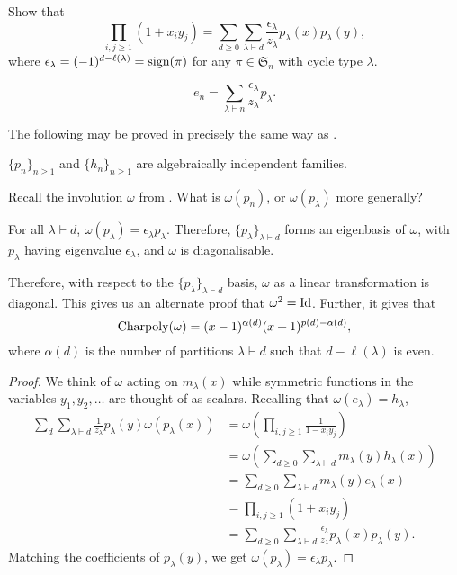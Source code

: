 	\begin{exercise}
		Show that
		\[ \prod_{i,j \ge 1} (1+x_iy_j) = \sum_{d \ge 0} \sum_{\lambda \vdash d} \frac{\epsilon_\lambda}{z_\lambda} p_\lambda(x) p_\lambda(y), \]
		where $\epsilon_\lambda = (-1)^{d - \ell(\lambda)} = \operatorname{sign}(\pi)$ for any $\pi \in \mathfrak{S}_n$ with cycle type $\lambda$.
	\end{exercise}

	\begin{corollary}
		\[ e_n = \sum_{\lambda \vdash n} \frac{\epsilon_\lambda}{z_\lambda} p_\lambda. \]
	\end{corollary}

	The following may be proved in precisely the same way as .
	\begin{fpor}
		$\{p_n\}_{n \ge 1}$ and $\{h_n\}_{n \ge 1}$ are algebraically independent families.
	\end{fpor}

	Recall the involution $\omega$ from . What is $\omega(p_n)$, or $\omega(p_\lambda)$ more generally?

	\begin{ftheo}
		\label{theo: p eigenbasis of omega}
		For all $\lambda \vdash d$, $\omega(p_\lambda) = \epsilon_\lambda p_\lambda$. Therefore, $\{p_\lambda\}_{\lambda \vdash d}$ forms an eigenbasis of $\omega$, with $p_\lambda$ having eigenvalue $\epsilon_\lambda$, and $\omega$ is diagonalisable.
	\end{ftheo}
	Therefore, with respect to the $\{p_\lambda\}_{\lambda \vdash d}$ basis, $\omega$ as a linear transformation is diagonal. This gives us an alternate proof that $\omega^2 = \operatorname{Id}$. Further, it gives that
	\[ \operatorname{Charpoly}(\omega) = (x-1)^{\alpha(d)} (x+1)^{p(d) - \alpha(d)}, \]
	where $\alpha(d)$ is the number of partitions $\lambda \vdash d$ such that $d - \ell(\lambda)$ is even.
	\begin{proof}
		We think of $\omega$ acting on $m_\lambda(x)$ while symmetric functions in the variables $y_1,y_2,\ldots$ are thought of as scalars. Recalling that $\omega(e_\lambda) = h_\lambda$,
		\begin{align*}
			\sum_{d}\sum_{\lambda \vdash d} \frac{1}{z_\lambda} p_\lambda(y) \omega(p_\lambda(x)) &= \omega \left( \prod_{i,j \ge 1} \frac{1}{1-x_iy_j} \right) \\
				&= \omega \left( \sum_{d \ge 0} \sum_{\lambda \vdash d} m_\lambda(y) h_\lambda(x) \right) \\
				&= \sum_{d \ge 0} \sum_{\lambda \vdash d} m_\lambda(y) e_\lambda(x) \\
				&= \prod_{i,j \ge 1} (1+x_iy_j) \\
				&= \sum_{d \ge 0} \sum_{\lambda \vdash d} \frac{\epsilon_\lambda}{z_\lambda} p_\lambda(x) p_\lambda(y).
		\end{align*}
		Matching the coefficients of $p_\lambda(y)$, we get $\omega(p_\lambda) = \epsilon_\lambda p_\lambda$.
	\end{proof}

